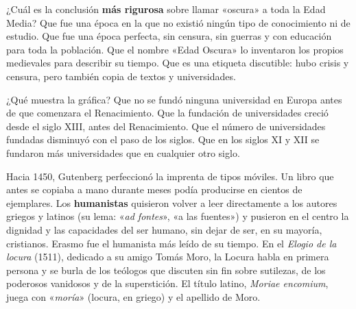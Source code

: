 \documentclass[carta,doscolumnas,compacta]{../plantilla/evaluacion}
\begin{document}
\begin{preguntas}
\begin{pregunta}[D]
¿Cuál es la conclusión \textbf{más rigurosa} sobre llamar «oscura» a toda la Edad Media?
\opcioneslargas
  {Que fue una época en la que no existió ningún tipo de conocimiento ni de estudio.}
  {Que fue una época perfecta, sin censura, sin guerras y con educación para toda la población.}
  {Que el nombre «Edad Oscura» lo inventaron los propios medievales para describir su tiempo.}
  {Que es una etiqueta discutible: hubo crisis y censura, pero también copia de textos y universidades.}
\end{pregunta}

\begin{pregunta}[B]
¿Qué muestra la gráfica?
\opcioneslargas
  {Que no se fundó ninguna universidad en Europa antes de que comenzara el Renacimiento.}
  {Que la fundación de universidades creció desde el siglo XIII, antes del Renacimiento.}
  {Que el número de universidades fundadas disminuyó con el paso de los siglos.}
  {Que en los siglos XI y XII se fundaron más universidades que en cualquier otro siglo.}
\end{pregunta}

\begin{contexto}
%
{\small Hacia 1450, Gutenberg perfeccionó la imprenta de tipos móviles. Un libro que antes se
copiaba a mano durante meses podía producirse en cientos de ejemplares. Los \textbf{humanistas}
quisieron volver a leer directamente a los autores griegos y latinos (su lema: «\emph{ad fontes}»,
«a las fuentes») y pusieron en el centro la dignidad y las capacidades del ser humano, sin dejar de
ser, en su mayoría, cristianos.}
%
{\small Erasmo fue el humanista más leído de su tiempo. En el \emph{Elogio de la locura} (1511),
dedicado a su amigo Tomás Moro, la Locura habla en primera persona y se burla de los teólogos que
discuten sin fin sobre sutilezas, de los poderosos vanidosos y de la superstición. El título latino,
\emph{Moriae encomium}, juega con «\emph{moría}» (locura, en griego) y el apellido de Moro.}
\end{contexto}


\end{preguntas}
\end{document}
